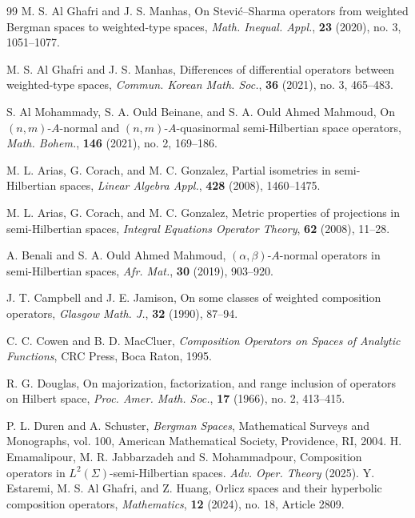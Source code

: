 \documentclass{amsart}
\theoremstyle{definition}\newtheorem{defn}[thm]{Definition}
\theoremstyle{remark}
\numberwithin{equation}{section}
\begin{document}
\begin{thebibliography}{99}
M. S. Al Ghafri and J. S. Manhas,
\newblock On Stević–Sharma operators from weighted Bergman spaces to weighted-type spaces,
\newblock \textit{Math. Inequal. Appl.}, \textbf{23} (2020), no. 3, 1051--1077.

M. S. Al Ghafri and J. S. Manhas,
\newblock Differences of differential operators between weighted-type spaces,
\newblock \textit{Commun. Korean Math. Soc.}, \textbf{36} (2021), no. 3, 465--483.

S. Al Mohammady, S. A. Ould Beinane, and S. A. Ould Ahmed Mahmoud,
\newblock On \((n,m)\)-\(A\)-normal and \((n,m)\)-\(A\)-quasinormal semi-Hilbertian space operators,
\newblock \textit{Math. Bohem.}, \textbf{146} (2021), no. 2, 169--186.

M. L. Arias, G. Corach, and M. C. Gonzalez,
\newblock Partial isometries in semi-Hilbertian spaces,
\newblock \textit{Linear Algebra Appl.}, \textbf{428} (2008), 1460--1475.

M. L. Arias, G. Corach, and M. C. Gonzalez,
\newblock Metric properties of projections in semi-Hilbertian spaces,
\newblock \textit{Integral Equations Operator Theory}, \textbf{62} (2008), 11--28.

A. Benali and S. A. Ould Ahmed Mahmoud,
\newblock \((\alpha,\beta)\)-\(A\)-normal operators in semi-Hilbertian spaces,
\newblock \textit{Afr. Mat.}, \textbf{30} (2019), 903--920.

J. T. Campbell and J. E. Jamison,
\newblock On some classes of weighted composition operators,
\newblock \textit{Glasgow Math. J.}, \textbf{32} (1990), 87--94.

C. C. Cowen and B. D. MacCluer,
\newblock \textit{Composition Operators on Spaces of Analytic Functions},
\newblock CRC Press, Boca Raton, 1995.

R. G. Douglas,
\newblock On majorization, factorization, and range inclusion of operators on Hilbert space,
\newblock \textit{Proc. Amer. Math. Soc.}, \textbf{17} (1966), no. 2, 413--415.

P. L. Duren and A. Schuster,
\newblock \textit{Bergman Spaces},
\newblock Mathematical Surveys and Monographs, vol. 100, American Mathematical Society, Providence, RI, 2004.
 H. Emamalipour, M. R. Jabbarzadeh and S. Mohammadpour,
\newblock Composition operators in \(L^{2}(\Sigma )\)-semi-Hilbertian spaces.
\newblock \textit{ Adv. Oper. Theory}  (2025).
Y. Estaremi, M. S. Al Ghafri, and Z. Huang,
\newblock Orlicz spaces and their hyperbolic composition operators,
\newblock \textit{Mathematics}, \textbf{12} (2024), no. 18, Article 2809.


\end{thebibliography}
\end{document}
